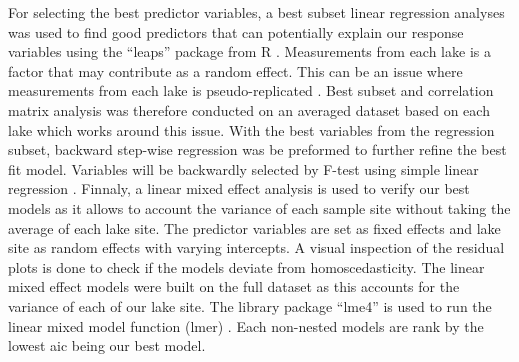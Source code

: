 For selecting the best predictor variables, a best subset linear regression analyses was used to find good predictors that can potentially explain our response variables using the ``leaps'' package from R \cite{miller_leaps:_2017}.  Measurements from each lake is a factor that may contribute as a random effect. This can be an issue where measurements from each lake is pseudo-replicated \cite{eisenhart_assumptions_1947}. Best subset and correlation matrix analysis was therefore conducted on an averaged dataset based on each lake which works around this issue.
With the best variables from the regression subset, backward step-wise regression was be preformed to further refine the best fit model. Variables will be backwardly selected by F-test using simple linear regression \cite{kenward_method_1987}. Finnaly, a linear mixed effect analysis is used to verify our best models as it allows to account the variance of each sample site without taking the average of each lake site. The predictor variables are set as fixed effects and lake site as random effects with varying intercepts. A visual inspection of the residual plots is done to check if the models deviate from homoscedasticity.  The linear mixed effect models were built on the full dataset as this accounts for the variance of each of our lake site\cite{crawley_r_2007}. The library package ``lme4'' is used to run the linear mixed model function (lmer) \cite{bates_fitting_2015}. Each non-nested models are rank by the lowest \gls{aic} being our best model.



